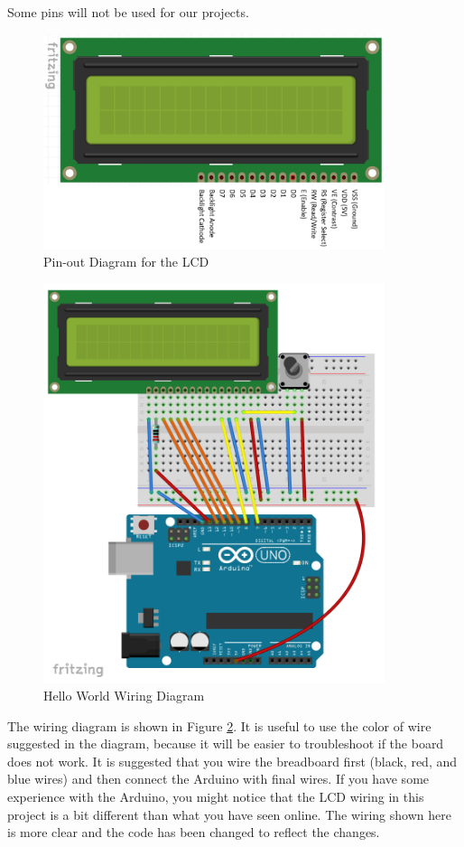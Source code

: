 \documentclass[]{article}
\begin{document}
Some pins will not be used for our projects.

\begin{figure}
	\centering
	\includegraphics[width=10cm]{pics/lcd pinout.png}
	\caption{Pin-out Diagram for the LCD}
	\label{fig2}
\end{figure}

\begin{figure}
	\centering
	\includegraphics[width=10cm]{pics/lcd wiring.png}
	\caption{Hello World Wiring Diagram}
	\label{HelloWorld}
\end{figure}

The wiring diagram is shown in Figure \ref{HelloWorld}.  It is useful to use the color of wire suggested in the diagram, because it will be  easier to troubleshoot if the board does not work.  It is suggested that you wire the breadboard first (black, red, and blue wires) and then connect the Arduino with final wires.  If you have some experience with the Arduino, you might notice that the LCD wiring in this project is a bit different than what you have seen online.  The wiring shown here is more clear and the code has been changed to reflect the changes.
\end{document}
